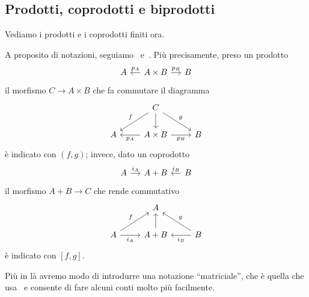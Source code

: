 \subsection{Prodotti, coprodotti e biprodotti}

Vediamo i prodotti e i coprodotti finiti ora.

\begin{notation}
A proposito di notazioni, seguiamo~\cite{leinster:categories}
e~\cite{riehl:categories}. Più precisamente, preso un prodotto
\[
  \begin{tikzcd}[column sep=small]
    A & A \times B \ar["{p_A}", l, swap] \ar["{p_B}", r] & B
  \end{tikzcd}
\]
il morfismo \(C \to A \times B\) che fa commutare il diagramma
\[
  \begin{tikzcd}
    & C \ar["{f}", dl, swap] \ar[d] \ar["{g}", dr] \\
    A & A \times B \ar["{p_A}", l] \ar["{p_B}", r, swap] & B
  \end{tikzcd}
\]
è indicato con \((f, g)\); invece, dato un coprodotto
\[
  \begin{tikzcd}[column sep=small]
    A \ar["{i_A}", r] & A + B & B \ar["{i_B}", l, swap]
  \end{tikzcd}
\]
il morfismo \(A+B \to C\) che rende commutativo
\[
  \begin{tikzcd}
    & A \\
    A \ar["{i_A}", r, swap] \ar["{f}", ur] & A + B \ar[u] & B
    \ar["{i_B}", l] \ar["{g}", ul, swap]
  \end{tikzcd}
\]
è indicato con \([f, g]\).
\end{notation}

Più in là avremo modo di introdurre una notazione ``matriciale'', che è
quella che usa~\cite{buehler:exactcategories} e consente di fare alcuni
conti molto più facilmente.

